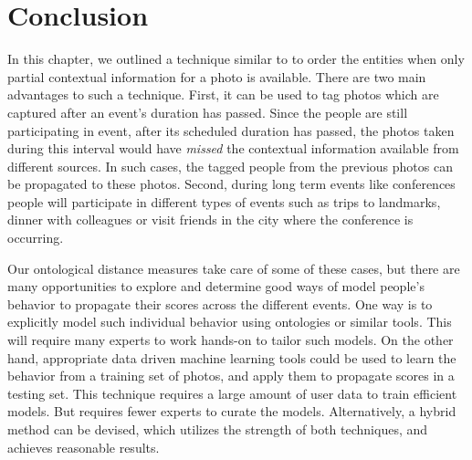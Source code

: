 \section{Conclusion}
In this chapter, we outlined a technique similar to \cite{page1999pagerank} to order the entities when only partial contextual information for a photo is available. There are two main advantages to such a technique. First, it can be used to tag photos which are captured after an event's duration has passed. Since the people are still participating in event, after its scheduled duration has passed, the photos taken during this interval would have \textit{missed} the contextual information available from different sources. In such cases, the tagged people from the previous photos can be propagated to these photos. Second, during long term events like conferences people will participate in different types of events such as trips to landmarks, dinner with colleagues or visit friends in the city where the conference is occurring. 

Our ontological distance measures take care of some of these cases, but there are many opportunities to explore and determine good ways of model people's behavior to propagate their scores across the different events. One way is to explicitly model such individual behavior using ontologies or similar tools. This will require many experts to work hands-on to tailor such models. On the other hand, appropriate data driven machine learning tools could be used to learn the behavior from a training set of photos, and apply them to propagate scores in a testing set. This technique requires a large amount of user data to train efficient models. But requires fewer experts to curate the models. Alternatively, a hybrid method can be devised, which utilizes the strength of both techniques, and achieves reasonable results.